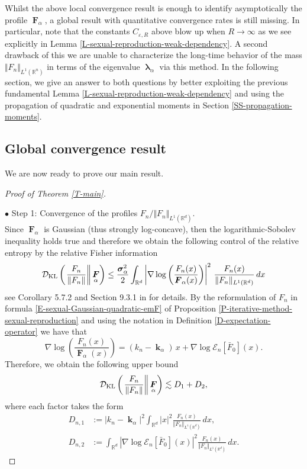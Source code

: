 \documentclass[reqno]{amsart}
\DeclareMathOperator{\blambda}{\boldsymbol{\lambda}}
\DeclareMathOperator{\bsigma}{\boldsymbol{\sigma}}
\DeclareMathOperator{\bF}{\boldsymbol{F}}
\DeclareMathOperator{\bk}{\boldsymbol{k}}
\numberwithin{equation}{section}
\begin{document}
{Whilst the above local convergence result is enough to identify asymptotically the profile $\bF_\alpha$, a global result with quantitative convergence rates is still missing. In particular, note that the constants $C_{\varepsilon,R}$ above blow up when $R\rightarrow\infty$ as we see explicitly in Lemma \ref{L-sexual-reproduction-weak-dependency}. A second drawback of this we are unable to characterize the long-time behavior of the mass $\Vert F_n\Vert_{L^1(\mathbb{R}^n)}$ in terms of the eigenvalue $\blambda_\alpha$ via this method. In the following section, we give an answer to both questions by better exploiting the previous fundamental Lemma \ref{L-sexual-reproduction-weak-dependency} and using the propagation of quadratic and exponential moments in Section \ref{SS-propagation-moments}.

\subsection{Global convergence result}
We are now ready to prove our main result.

\begin{proof}[Proof of Theorem \ref{T-main}]

~\medskip

$\bullet$ {\sc Step 1}: Convergence of the profiles $F_n/\Vert F_n\Vert_{L^1(\mathbb{R}^d)}$.\\
Since $\bF_\alpha$ is Gaussian (thus strongly log-concave), then the logarithmic-Sobolev inequality holds true and therefore we obtain the following control of the relative entropy by the relative Fisher information
$$\mathcal{D}_{\rm KL}\left(\left.\frac{F_n}{\Vert F_n\Vert}\right\Vert \bF_\alpha\right)\leq \frac{\bsigma_\alpha^2}{2}\int_{\mathbb{R}^d}\left\vert\nabla\log\left(\frac{F_n(x)}{\bF_\alpha(x)}\right)\right\vert^2\,\frac{F_n(x)}{\Vert F_n\Vert_{L^1(\mathbb{R}^d)}}\,dx$$
see Corollary 5.7.2 and Section 9.3.1 in \cite{BGL-14} for details. By the reformulation of $F_n$ in formula \eqref{E-sexual-Gaussian-quadratic-emF} of Proposition \ref{P-iterative-method-sexual-reproduction} and using the notation in Definition \ref{D-expectation-operator} we have that
$$\nabla\log \left(\frac{F_n(x)}{\bF_\alpha(x)}\right)=(k_n-\bk_\alpha)\,x+\nabla\log \mathcal{E}_n[\bar F_0](x).$$
Therefore, we obtain the following upper bound
\begin{align}\label{E-relative-entropy-bound-decomposition}
\mathcal{D}_{\rm KL}\left(\left.\frac{F_n}{\Vert F_n\Vert}\right\Vert \bF_\alpha\right)\lesssim D_1+D_2,
\end{align}
where each factor takes the form
\begin{align*}
D_{n,1}&:=|k_n-\bk_\alpha|^2\int_{\mathbb{R}^d}|x|^2\frac{F_n(x)}{\Vert F_n\Vert_{L^1(\mathbb{R}^d)}}\,dx,\\
D_{n,2}&:=\int_{\mathbb{R}^d}\left\vert\nabla \log \mathcal{E}_n[\bar F_0](x)\right\vert^2\frac{F_n(x)}{\Vert F_n\Vert_{L^1(\mathbb{R}^d)}}\,dx.
\end{align*}


\end{proof}}
\end{document}
